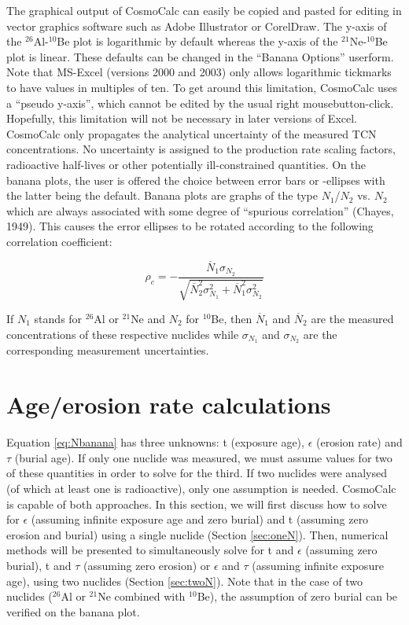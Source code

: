 \documentclass{article}
\begin{document}
The graphical output of CosmoCalc  can easily be copied and pasted for
editing  in vector  graphics  software such  as  Adobe Illustrator  or
CorelDraw.  The y-axis of  the $^{26}$Al-$^{10}$Be plot is logarithmic
by  default whereas  the  y-axis of  the  $^{21}$Ne-$^{10}$Be plot  is
linear.   These defaults  can  be changed  in  the ``Banana  Options''
userform.   Note that MS-Excel  (versions 2000  and 2003)  only allows
logarithmic  tickmarks to  have values  in multiples  of ten.   To get
around  this limitation,  CosmoCalc  uses a  ``pseudo y-axis'',  which
cannot  be edited  by the  usual right  mousebutton-click.  Hopefully,
this  limitation will not  be necessary  in later  versions of  Excel. 
CosmoCalc only  propagates the analytical uncertainty  of the measured
TCN concentrations.  No uncertainty is assigned to the production rate
scaling   factors,  radioactive   half-lives   or  other   potentially
ill-constrained quantities.  On the  banana plots, the user is offered
the choice between  error bars or -ellipses with  the latter being the
default.  Banana plots  are graphs of the type  $N_1$/$N_2$ vs.  $N_2$
which   are  always   associated  with   some  degree   of  ``spurious
correlation'' (Chayes,  1949).  This causes  the error ellipses  to be
rotated according to the following correlation coefficient:

\begin{equation}
  \label{eq:correlation}
  \rho_c = - \frac{\overline{N}_1 \sigma_{N_2} }
{ \sqrt{\overline{N}_2^2 \sigma_{N_1}^2 + \overline{N}_1^2 \sigma_{N_2}^2}}
\end{equation}

If $N_1$  stands for $^{26}$Al  or $^{21}$Ne and $N_2$  for $^{10}$Be,
then   $\overline{N}_1$   and   $\overline{N}_2$  are   the   measured
concentrations of  these respective nuclides  while $\sigma_{N_1}$ and
$\sigma_{N_2}$ are the corresponding measurement uncertainties.

\section{Age/erosion rate calculations}\label{sec:age}

Equation  \ref{eq:Nbanana}  has  three  unknowns:  t  (exposure  age),
$\epsilon$ (erosion rate) and $\tau$ (burial age). If only one nuclide
was measured,  we must  assume values for  two of these  quantities in
order to solve for the third.  If two nuclides were analysed (of which
at  least  one  is  radioactive),  only  one  assumption  is  needed.  
CosmoCalc is  capable of  both approaches.  In  this section,  we will
first discuss how to  solve for $\epsilon$ (assuming infinite exposure
age and zero burial) and t  (assuming zero erosion and burial) using a
single nuclide (Section \ref{sec:oneN}).  Then, numerical methods will
be presented  to simultaneously solve  for t and  $\epsilon$ (assuming
zero burial), t  and $\tau$ (assuming zero erosion)  or $\epsilon$ and
$\tau$ (assuming  infinite exposure age), using  two nuclides (Section
\ref{sec:twoN}).  Note that in the  case of two nuclides ($^{26}$Al or
$^{21}$Ne combined with $^{10}$Be),  the assumption of zero burial can
be verified on the banana plot.
\end{document}

